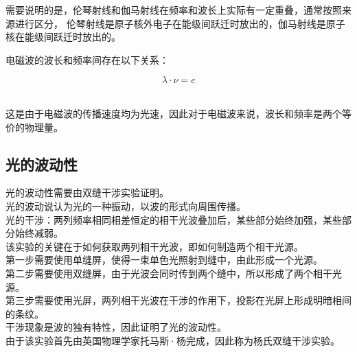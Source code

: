 \documentclass[UTF8]{ctexart}
\begin{document}
    需要说明的是，伦琴射线和伽马射线在频率和波长上实际有一定重叠，通常按照来源进行区分，
    伦琴射线是原子核外电子在能级间跃迁时放出的，伽马射线是原子核在能级间跃迁时放出的。

\newpage

    电磁波的波长和频率间存在以下关系：
    \begin{large}
        \begin{equation*}
            \lambda\cdot\nu=c
        \end{equation*}
    \end{large}\\
    这是由于电磁波的传播速度均为光速，因此对于电磁波来说，波长和频率是两个等价的物理量。\\

\subsection{光的波动性}
    光的波动性需要由双缝干涉实验证明。\\[3mm]
    光的波动说认为光的一种振动，以波的形式向周围传播。\\[3mm]
    光的干涉：两列频率相同相差恒定的相干光波叠加后，某些部分始终加强，某些部分始终减弱。\\[5mm]
    该实验的关键在于如何获取两列相干光波，即如何制造两个相干光源。\\[3mm]
    第一步需要使用单缝屏，使得一束单色光照射到缝中，由此形成一个光源。\\[3mm]
    第二步需要使用双缝屏，由于光波会同时传到两个缝中，所以形成了两个相干光源。\\[3mm]
    第三步需要使用光屏，两列相干光波在干涉的作用下，投影在光屏上形成明暗相间的条纹。\\[3mm]
    干涉现象是波的独有特性，因此证明了光的波动性。\\[5mm]
    由于该实验首先由英国物理学家托马斯·杨完成，因此称为杨氏双缝干涉实验。\vspace{8pt}
\end{document}
